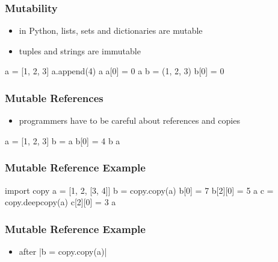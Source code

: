 \documentclass[dvipsnames]{beamer}
\theoremstyle{plain}
\begin{document}
\begin{frame}[fragile]
  \frametitle{Mutability}

  \begin{itemize}
    \item in Python, lists, sets and dictionaries are mutable
    \item tuples and strings are immutable
  \end{itemize}

  \begin{example}[Python]
    \begin{pyconsole}[pymut]
a = [1, 2, 3]
a.append(4)
a
a[0] = 0
a
b = (1, 2, 3)
b[0] = 0
    \end{pyconsole}
  \end{example}
\end{frame}

\begin{frame}[fragile]
  \frametitle{Mutable References}

  \begin{itemize}
    \item programmers have to be careful about references and copies
  \end{itemize}

  \begin{example}[Python]
    \begin{pyconsole}[pymutref]
a = [1, 2, 3]
b = a
b[0] = 4
b
a
    \end{pyconsole}
  \end{example}
\end{frame}

\begin{frame}[fragile]
  \frametitle{Mutable Reference Example}

  \begin{example}[Python]
    \begin{pyconsole}[pycopy]
import copy
a = [1, 2, [3, 4]]
b = copy.copy(a)
b[0] = 7
b[2][0] = 5
a
c = copy.deepcopy(a)
c[2][0] = 3
a
    \end{pyconsole}
  \end{example}
\end{frame}

\begin{frame}
  \frametitle{Mutable Reference Example}

  \begin{itemize}
    \item after \pyv|b = copy.copy(a)|
  \end{itemize}

  \begin{center}
  \end{center}
\end{frame}
\end{document}
